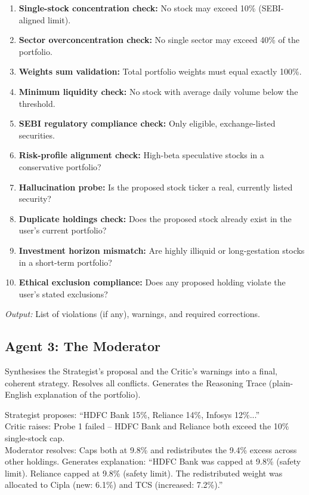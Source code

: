 \documentclass[12pt, a4paper, openany, oneside]{report}
\begin{document}
\begin{enumerate}
  \item \textbf{Single-stock concentration check:} No stock may exceed 10\% (SEBI-aligned limit).
  \item \textbf{Sector overconcentration check:} No single sector may exceed 40\% of the portfolio.
  \item \textbf{Weights sum validation:} Total portfolio weights must equal exactly 100\%.
  \item \textbf{Minimum liquidity check:} No stock with average daily volume below the threshold.
  \item \textbf{SEBI regulatory compliance check:} Only eligible, exchange-listed securities.
  \item \textbf{Risk-profile alignment check:} High-beta speculative stocks in a conservative portfolio?
  \item \textbf{Hallucination probe:} Is the proposed stock ticker a real, currently listed security?
  \item \textbf{Duplicate holdings check:} Does the proposed stock already exist in the user's current portfolio?
  \item \textbf{Investment horizon mismatch:} Are highly illiquid or long-gestation stocks in a short-term portfolio?
  \item \textbf{Ethical exclusion compliance:} Does any proposed holding violate the user's stated exclusions?
\end{enumerate}

\textit{Output:} List of violations (if any), warnings, and required corrections.

\subsection*{Agent 3: The Moderator}
Synthesises the Strategist's proposal and the Critic's warnings into a final, coherent strategy. Resolves all conflicts. Generates the Reasoning Trace (plain-English explanation of the portfolio).

\begin{examplebox}
Strategist proposes: ``HDFC Bank 15\%, Reliance 14\%, Infosys 12\%...''\\ 
Critic raises: Probe 1 failed -- HDFC Bank and Reliance both exceed the 10\% single-stock cap.\\
Moderator resolves: Caps both at 9.8\% and redistributes the 9.4\% excess across other holdings. Generates explanation: ``HDFC Bank was capped at 9.8\% (safety limit). Reliance capped at 9.8\% (safety limit). The redistributed weight was allocated to Cipla (new: 6.1\%) and TCS (increased: 7.2\%).''
\end{examplebox}
\end{document}
